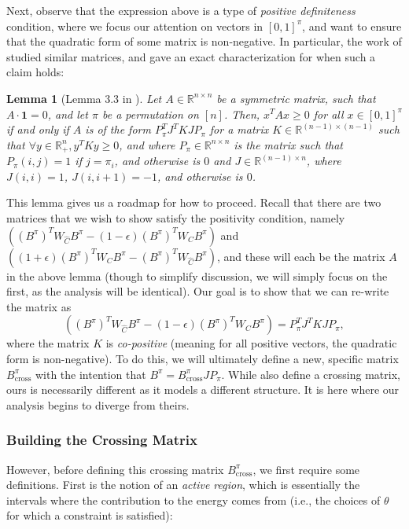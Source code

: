 \documentclass[11pt]{article}
\newtheorem{lemma}[theorem]{Lemma}
\theoremstyle{definition}
\newcommand{\R}{\mathbb{R}}
\newcommand{\eps}{\epsilon}
\begin{document}
Next, observe that the expression above is a type of \emph{positive definiteness} condition, where we focus our attention on vectors in $[0,1]^{\pi}$, and want to ensure that the quadratic form of some matrix is non-negative. In particular, the work of \cite{SY19} studied similar matrices, and gave an exact characterization for when such a claim holds:

\begin{lemma}[Lemma 3.3 in \cite{SY19}]\label{lem:SYintro}
	Let $A \in \R^{n \times n}$ be a symmetric matrix, such that $A \cdot \mathbf{1} = 0$, and let $\pi$ be a permutation on $[n]$. Then, $x^TAx \geq 0$ for all $x \in [0,1]^{\pi}$ if and only if $A$ is of the form $P_{\pi}^T J^T K J P_{\pi}$ for a matrix $K \in \R^{(n-1) \times (n-1)}$ such that $\forall y \in \R_+^n, y^T K y \geq 0$, and where  $P_{\pi} \in \R^{n \times n}$ is the matrix such that $P_{\pi}(i,j) = 1$ if $j = \pi_i$, and otherwise is $0$ and $J \in \R^{(n-1) \times n}$, where $J(i,i) = 1$, $J(i, i+1) = -1$, and otherwise is $0$.
\end{lemma}

This lemma gives us a roadmap for how to proceed. Recall that there are two matrices that we wish to show satisfy the positivity condition, namely $\left ( (B^{\pi})^T W_{\hat{C}} B^{\pi} - (1 - \eps)(B^{\pi})^T W_{C} B^{\pi}  \right )$ and $ \left ( (1 + \eps)(B^{\pi})^T W_{C} B^{\pi}  - (B^{\pi})^T W_{\hat{C}} B^{\pi}  \right )$,  and these will each be the matrix $A$ in the above lemma (though to simplify discussion, we will simply focus on the first, as the analysis will be identical). Our goal is to show that we can re-write the matrix as
\[
\left ( (B^{\pi})^T W_{\hat{C}} B^{\pi} - (1 - \eps)(B^{\pi})^T W_{C} B^{\pi}  \right ) = P_{\pi}^T J^T K J P_{\pi},
\]
where the matrix $K$ is \emph{co-positive} (meaning for all positive vectors, the quadratic form is non-negative). To do this, we will ultimately define a new, specific matrix $B_{\mathrm{cross}}^{\pi}$ with the intention that $B^{\pi} = B_{\mathrm{cross}}^{\pi} J P_{\pi}$. While \cite{SY19} also define a crossing matrix, ours is necessarily different as it models a different structure. It is here where our analysis begins to diverge from theirs. 

\subsubsection{Building the Crossing Matrix}

However, before defining this crossing matrix $B_{\mathrm{cross}}^{\pi}$, we first require some definitions. First is the notion of an \emph{active region}, which is essentially the intervals where the contribution to the energy comes from (i.e., the choices of $\theta$ for which a constraint is satisfied):
\end{document}
